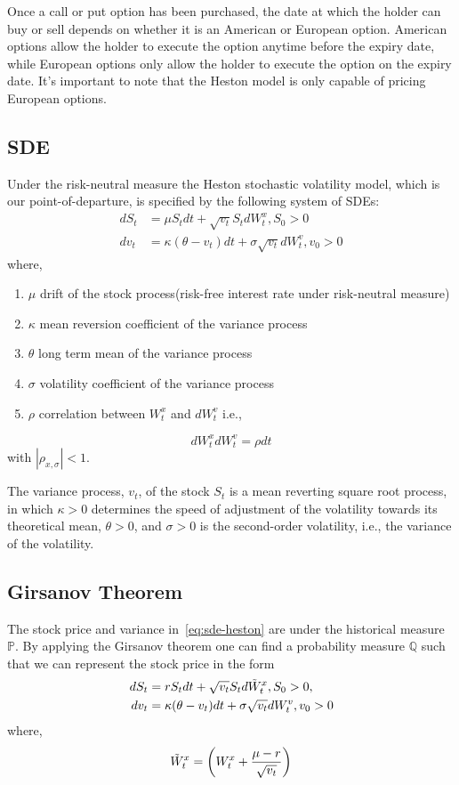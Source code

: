 Once a call or put option has been purchased, the date at which
the holder can buy or sell depends on whether it is an American or
European option.
American options allow the holder to execute the option
anytime before the expiry date, while European options
only allow the holder to execute the option on the expiry date.
It’s important to note that the Heston model is only capable of
pricing European options.


\subsection{SDE}
\par Under the risk-neutral measure the Heston stochastic volatility model,
which is our point-of-departure, is specified by the following system of SDEs:
\begin{align}
	dS_t &= \mu S_t dt+ \sqrt{v_t}S_t dW^x_t , S_0 > 0 \\
	dv_t &= \kappa( \theta - v_t)dt+ \sigma\sqrt{v_t}dW^v_t , v_0 > 0
	\label{eq:sde-heston}
\end{align}
where,
\begin{enumerate}
	\item $\mu$ drift of the stock process(risk-free interest rate under
	risk-neutral measure)
	\item $\kappa$ mean reversion coefficient of the variance process
	\item $\theta$ long term mean of the variance process
	\item $\sigma$ volatility coefficient of the variance process
	\item $\rho$ correlation between $W^x_t$ and $dW^v_t$ i.e.,
\end{enumerate}

\begin{equation}
	dW^x_t dW^v_t = \rho dt
\end{equation}
with $|\rho_{x,\sigma} | < 1$.

The variance process, $v_t$, of the stock $S_t$ is a mean reverting
square root process, in which $\kappa > 0$ determines the speed of
adjustment of the volatility towards its theoretical mean,
$\theta > 0$, and $\sigma > 0$ is the second-order volatility, i.e.,
the variance of the volatility.


\subsection{Girsanov Theorem}
The stock price and variance in~\ref{eq:sde-heston} are under
the historical measure $\mathbb{P}$.
By applying the Girsanov theorem one can find a probability
measure $\mathbb{Q}$ such that we can represent the stock price in the form
\begin{align}
	dS_t &=  rS_t dt+ \sqrt{v_t}S_t d\Tilde{W}^x_t , S_0 > 0,\\
	dv_t &= \kappa( \theta - v_t)dt+ \sigma\sqrt{v_t}dW^v_t , v_0 > 0
	\label{eq:girsanov-heston-sde}
\end{align}
where,
\begin{equation}
	\Tilde{W}^x_t = \left(W^x_t + \frac{\mu - r}{\sqrt{v_t}}\right)
\end{equation}


